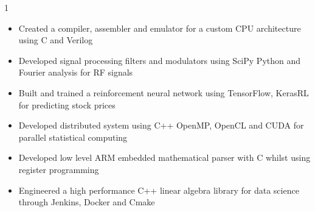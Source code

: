 \documentclass[11pt,a4paper,ragged2e]{altacv}
\begin{document}
\begin{paracol}{1}
\begin{itemize}
\item Created a compiler, assembler and emulator for a custom CPU architecture using C and Verilog
\item Developed signal processing filters and modulators using SciPy Python and Fourier analysis for RF signals 

\item Built and trained a reinforcement neural network using TensorFlow, KerasRL for predicting stock prices
\item Developed distributed system using C++ OpenMP, OpenCL and CUDA for parallel statistical computing
\item Developed low level ARM embedded mathematical parser with C whilst using register programming
\item Engineered a high performance C++ linear algebra library for data science through Jenkins, Docker and Cmake
\end{itemize}
\tightdivider


\end{paracol}
\end{document}
